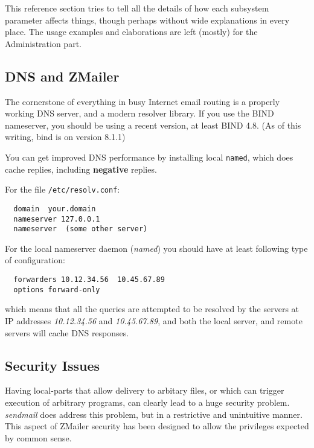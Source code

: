 
This reference section tries to tell all the details of how each
subsystem parameter affects things, though perhaps without wide
explanations in every place. The usage examples and elaborations
are left (mostly) for the Administration part.

%
%

\subsection{DNS and ZMailer}

The cornerstone of everything in busy Internet email routing is a properly
working DNS server, and a modern resolver library. If you use the BIND 
nameserver, you should be using a recent version, at least BIND 4.8.
(As of this writing, bind is on version 8.1.1)

You can get improved DNS performance by installing local {\tt named},
which does cache replies, including {\bf negative} replies.

For the file {\tt /etc/resolv.conf}:
\begin{verbatim}
  domain  your.domain
  nameserver 127.0.0.1
  nameserver  (some other server)
\end{verbatim}


For the local nameserver daemon ({\em named\/}) you should have
at least following type of configuration:
\begin{verbatim}
  forwarders 10.12.34.56  10.45.67.89
  options forward-only
\end{verbatim}

which means that all the queries are attempted to be resolved
by the servers at IP addresses {\em 10.12.34.56\/} and
{\em 10.45.67.89\/}, and both the local server, and remote
servers will cache DNS responses.


\subsection{Security Issues}


Having local-parts that allow delivery to arbitary files, or which can trigger
execution of arbitrary programs, can clearly lead to a huge security
problem.  {\em sendmail\/} does address this problem, but in a restrictive and
unintuitive manner.  This aspect of ZMailer security has been designed to
allow the privileges expected by common sense.

